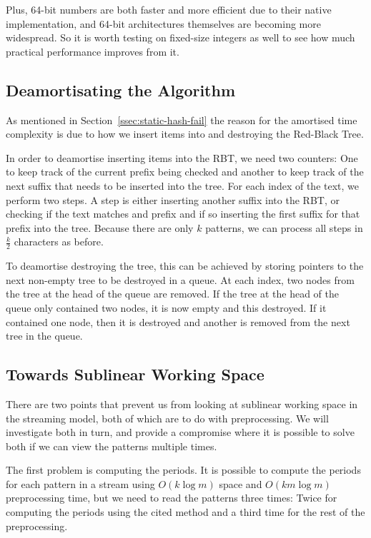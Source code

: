 \documentclass[ %
                    author={Dominic Joseph Moylett},
                    degree={MEng},
                     title={Dictionary Matching with Fingerprints},
                  subtitle={An Empirical Analysis},
                      type={research},
                      year={2015} ]{dissertation}
\begin{document}
Plus, 64-bit numbers are both faster and more efficient due to their native implementation, and 64-bit architectures themselves are becoming more widespread. So it is worth testing on fixed-size integers as well to see how much practical performance improves from it.

\subsection{Deamortisating the Algorithm}
\label{ssec:deamortise}

As mentioned in Section~\ref{ssec:static-hash-fail} the reason for the amortised time complexity is due to how we insert items into and destroying the Red-Black Tree.

In order to deamortise inserting items into the RBT, we need two counters: One to keep track of the current prefix being checked and another to keep track of the next suffix that needs to be inserted into the tree. For each index of the text, we perform two steps. A step is either inserting another suffix into the RBT, or checking if the text matches and prefix and if so inserting the first suffix for that prefix into the tree. Because there are only $k$ patterns, we can process all steps in $\frac{k}{2}$ characters as before.

To deamortise destroying the tree, this can be achieved by storing pointers to the next non-empty tree to be destroyed in a queue. At each index, two nodes from the tree at the head of the queue are removed. If the tree at the head of the queue only contained two nodes, it is now empty and this destroyed. If it contained one node, then it is destroyed and another is removed from the next tree in the queue.

\subsection{Towards Sublinear Working Space}

There are two points that prevent us from looking at sublinear working space in the streaming model, both of which are to do with preprocessing. We will investigate both in turn, and provide a compromise where it is possible to solve both if we can view the patterns multiple times.

The first problem is computing the periods. It is possible to compute the periods for each pattern in a stream \cite{ergun:sublinear-period} using $O(k\log m)$ space and $O(km\log m)$ preprocessing time, but we need to read the patterns three times: Twice for computing the periods using the cited method and a third time for the rest of the preprocessing.
\end{document}
